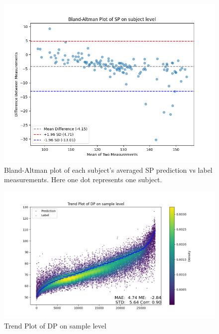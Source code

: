 \documentclass{article}
\begin{document}
\begin{figure}[H]
\centering
\includegraphics[width=\textwidth]{./Fig/Bland_Altman_Plot_SP_on_subject_level.png}
\caption{Bland-Altman plot of each subject's averaged SP prediction vs label measurements. Here one dot represents one subject.}
\label{fig:image1}
\end{figure}

\begin{figure}[H]
\centering
\includegraphics[width=\textwidth]{./Fig/Trend_Plot_DP_on_sample_level.png}
\caption{Trend Plot of DP on sample level}
\label{fig:image1}
\end{figure}
\end{document}
